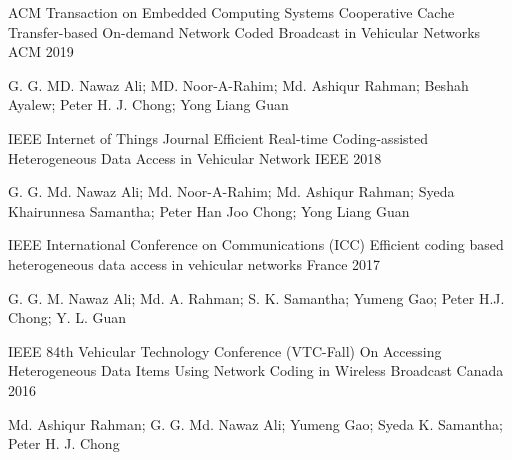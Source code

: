 

\begin{cventries}

  \cventry
    {ACM Transaction on Embedded Computing Systems} %
    {Cooperative Cache Transfer-based On-demand Network Coded Broadcast in Vehicular Networks} %
    {ACM} %
    {2019} %
    {
      \begin{cvitems} %
        \item {G. G. MD. Nawaz Ali; MD. Noor-A-Rahim; Md. Ashiqur Rahman; Beshah Ayalew; Peter H. J. Chong; Yong Liang Guan}
      \end{cvitems}
    }
    {}

  \cventry
    {IEEE Internet of Things Journal} %
    {Efficient Real-time Coding-assisted Heterogeneous Data Access in Vehicular Network} %
    {IEEE} %
    {2018} %
    {
      \begin{cvitems} %
        \item {G. G. Md. Nawaz Ali; Md. Noor-A-Rahim; Md. Ashiqur Rahman; Syeda Khairunnesa Samantha; Peter Han Joo Chong; Yong Liang Guan}
      \end{cvitems}
    }
    {}

  \cventry
    {IEEE International Conference on Communications (ICC)} %
    {Efficient coding based heterogeneous data access in vehicular networks} %
    {France} %
    {2017} %
    {
      \begin{cvitems} %
        \item {G. G. M. Nawaz Ali; Md. A. Rahman; S. K. Samantha; Yumeng Gao; Peter H.J. Chong; Y. L. Guan}
      \end{cvitems}
    }
    {}

  \cventry
    {IEEE 84th Vehicular Technology Conference (VTC-Fall)} %
    {On Accessing Heterogeneous Data Items Using Network Coding in Wireless Broadcast} %
    {Canada} %
    {2016} %
    {
      \begin{cvitems} %
        \item {Md. Ashiqur Rahman; G. G. Md. Nawaz Ali; Yumeng Gao; Syeda K. Samantha; Peter H. J. Chong}
      \end{cvitems}
    }
    {}


\end{cventries}
